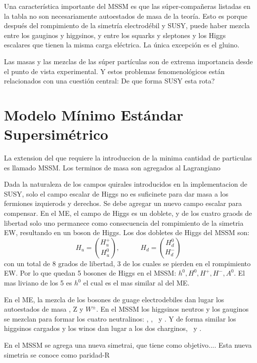 Una característica importante del MSSM es que las súper-compañeras listadas en la tabla no son
necesariamente autoestados de masa de la teoría. Esto es porque después del rompimiento de la simetría
electrodébil y SUSY, puede haber mezcla entre los gauginos y higgsinos, y entre los squarks y sleptones
y los Higgs escalares que tienen la misma carga eléctrica. La única excepción es el gluino.

Las masas y las mezclas de las súper partículas son de extrema importancia desde el punto de vista
experimental. Y estos problemas fenomenológicos están relacionados con una cuestión central:
De que forma SUSY esta rota?


\section{Modelo Mínimo Estándar Supersimétrico}

La extension del {\SM} que requiere la introduccion de la minima cantidad de particulas es llamado
MSSM. Los terminos de masa son agregados al Lagrangiano

Dada la naturaleza de los campos quirales introducidos en la implementacion de SUSY, solo el campo
escalar de Higgs no es suficinete para dar masa a los fermiones izquierods y derechos. Se debe
agregar un nuevo campo escalar para compensar. En el ME, el campo de Higgs es un doblete, y de los
cuatro graods de libertad solo uno permanece como consecuencia del rompimiento de la simetria EW, resultando
en un boson de Higgs. Los dos dobletes de Higgs del MSSM son:
%
\begin{equation}
  H_u = \binom{H_u^+}{H_u^0}, \quad \quad \quad H_d = \binom{H_d^0}{H_d^-}
\end{equation}
%
con un total de 8 grados de libertad, 3 de los cuales se pierden en el rompimiento EW. Por lo que
quedan 5 bosones de  Higgs en el MSSM: $h^0, H^0, H^+, H^-, A^0$. El mas liviano de los 5 es $h^0$
el cual es el mas similar al del ME.

En el ME, la mezcla de los bosones de guage electrodebiles dan lugar los autoestados de masa \gam, Z y $W^\pm$.
En el MSSM los higgsinos neutros y los gauginos se mezclan para formar los cuatro neutralinos:
\ninoone, \ninotwo, \ninothree\ y \ninofour.
Y de forma similar los higgsinos cargados y los winos dan lugar a los dos charginos, \chinoonepm\ y \chinotwopm.



En el MSSM se agrega una nueva simetrai, que tiene como objetivo.... Esta nueva simetria se conoce
como paridad-R

